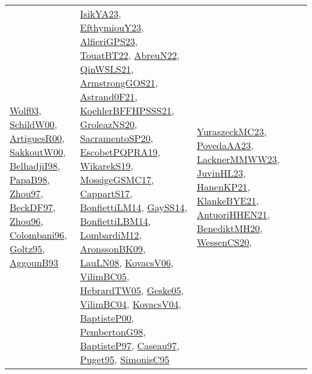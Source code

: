 {\begin{longtable}{lp{3cm}>{\raggedright}p{6cm}>{\raggedright}p{6cm}p{8cm}}
\href{papers/Wolf03.pdf}{Wolf03}\cite{Wolf03}, \href{articles/SchildW00.pdf}{SchildW00}\cite{SchildW00}, \href{articles/ArtiguesR00.pdf}{ArtiguesR00}\cite{ArtiguesR00}, \href{articles/SakkoutW00.pdf}{SakkoutW00}\cite{SakkoutW00}, \href{articles/BelhadjiI98.pdf}{BelhadjiI98}\cite{BelhadjiI98}, \href{articles/PapaB98.pdf}{PapaB98}\cite{PapaB98}, \href{articles/Zhou97.pdf}{Zhou97}\cite{Zhou97}, \href{papers/BeckDF97.pdf}{BeckDF97}\cite{BeckDF97}, \href{papers/Zhou96.pdf}{Zhou96}\cite{Zhou96}, \href{papers/Colombani96.pdf}{Colombani96}\cite{Colombani96}, \href{papers/Goltz95.pdf}{Goltz95}\cite{Goltz95}, \href{articles/AggounB93.pdf}{AggounB93}\cite{AggounB93} & \href{articles/IsikYA23.pdf}{IsikYA23}\cite{IsikYA23}, \href{papers/EfthymiouY23.pdf}{EfthymiouY23}\cite{EfthymiouY23}, \href{articles/AlfieriGPS23.pdf}{AlfieriGPS23}\cite{AlfieriGPS23}, \href{papers/TouatBT22.pdf}{TouatBT22}\cite{TouatBT22}, \href{articles/AbreuN22.pdf}{AbreuN22}\cite{AbreuN22}, \href{articles/QinWSLS21.pdf}{QinWSLS21}\cite{QinWSLS21}, \href{papers/ArmstrongGOS21.pdf}{ArmstrongGOS21}\cite{ArmstrongGOS21}, \href{papers/Astrand0F21.pdf}{Astrand0F21}\cite{Astrand0F21}, \href{articles/KoehlerBFFHPSSS21.pdf}{KoehlerBFFHPSSS21}\cite{KoehlerBFFHPSSS21}, \href{papers/GroleazNS20.pdf}{GroleazNS20}\cite{GroleazNS20}, \href{articles/SacramentoSP20.pdf}{SacramentoSP20}\cite{SacramentoSP20}, \href{articles/EscobetPQPRA19.pdf}{EscobetPQPRA19}\cite{EscobetPQPRA19}, \href{articles/WikarekS19.pdf}{WikarekS19}\cite{WikarekS19}, \href{papers/MossigeGSMC17.pdf}{MossigeGSMC17}\cite{MossigeGSMC17}, \href{papers/CappartS17.pdf}{CappartS17}\cite{CappartS17}, \href{papers/BonfiettiLM14.pdf}{BonfiettiLM14}\cite{BonfiettiLM14}, \href{papers/GaySS14.pdf}{GaySS14}\cite{GaySS14}, \href{articles/BonfiettiLBM14.pdf}{BonfiettiLBM14}\cite{BonfiettiLBM14}, \href{articles/LombardiM12.pdf}{LombardiM12}\cite{LombardiM12}, \href{papers/AronssonBK09.pdf}{AronssonBK09}\cite{AronssonBK09}, \href{papers/LauLN08.pdf}{LauLN08}\cite{LauLN08}, \href{papers/KovacsV06.pdf}{KovacsV06}\cite{KovacsV06}, \href{articles/VilimBC05.pdf}{VilimBC05}\cite{VilimBC05}, \href{papers/HebrardTW05.pdf}{HebrardTW05}\cite{HebrardTW05}, \href{papers/Geske05.pdf}{Geske05}\cite{Geske05}, \href{papers/VilimBC04.pdf}{VilimBC04}\cite{VilimBC04}, \href{papers/KovacsV04.pdf}{KovacsV04}\cite{KovacsV04}, \href{articles/BaptisteP00.pdf}{BaptisteP00}\cite{BaptisteP00}, \href{papers/PembertonG98.pdf}{PembertonG98}\cite{PembertonG98}, \href{papers/BaptisteP97.pdf}{BaptisteP97}\cite{BaptisteP97}, \href{papers/Caseau97.pdf}{Caseau97}\cite{Caseau97}, \href{papers/Puget95.pdf}{Puget95}\cite{Puget95}, \href{papers/SimonisC95.pdf}{SimonisC95}\cite{SimonisC95} & \href{papers/YuraszeckMC23.pdf}{YuraszeckMC23}\cite{YuraszeckMC23}, \href{papers/PovedaAA23.pdf}{PovedaAA23}\cite{PovedaAA23}, \href{articles/LacknerMMWW23.pdf}{LacknerMMWW23}\cite{LacknerMMWW23}, \href{papers/JuvinHL23.pdf}{JuvinHL23}\cite{JuvinHL23}, \href{papers/HanenKP21.pdf}{HanenKP21}\cite{HanenKP21}, \href{papers/KlankeBYE21.pdf}{KlankeBYE21}\cite{KlankeBYE21}, \href{papers/AntuoriHHEN21.pdf}{AntuoriHHEN21}\cite{AntuoriHHEN21}, \href{articles/BenediktMH20.pdf}{BenediktMH20}\cite{BenediktMH20}, \href{papers/WessenCS20.pdf}{WessenCS20}\cite{WessenCS20}, 
\end{longtable}}
